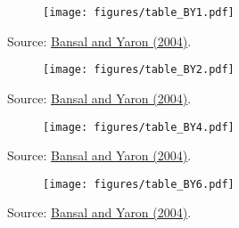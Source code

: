 \begin{frame}\label{slide:tabI}
\begin{scriptsize}
		\begin{figure}
			\texttt{[image: figures/table\_BY1.pdf]}
		\end{figure}
		\begin{tiny}
		\begin{center}
		Source: \href{http://onlinelibrary.wiley.com/doi/10.1111/j.1540-6261.2004.00670.x/abstract}{Bansal and Yaron (2004)}.
		\end{center}
		\end{tiny}
\end{scriptsize}
\end{frame}

\begin{frame}\label{slide:tabII}
\begin{scriptsize}
		\begin{figure}
			\texttt{[image: figures/table\_BY2.pdf]}
		\end{figure}
		\begin{tiny}
		\begin{center}
		Source: \href{http://onlinelibrary.wiley.com/doi/10.1111/j.1540-6261.2004.00670.x/abstract}{Bansal and Yaron (2004)}.
		\end{center}
		\end{tiny}
\end{scriptsize}
\end{frame}

\begin{frame}\label{slide:tabIV}
\begin{scriptsize}
		\begin{figure}
			\texttt{[image: figures/table\_BY4.pdf]}
		\end{figure}
		\begin{tiny}
		\begin{center}
		Source: \href{http://onlinelibrary.wiley.com/doi/10.1111/j.1540-6261.2004.00670.x/abstract}{Bansal and Yaron (2004)}.
		\end{center}
		\end{tiny}
\end{scriptsize}
\end{frame}

\begin{frame}\label{slide:tabVI}
\begin{scriptsize}
		\begin{figure}
			\texttt{[image: figures/table\_BY6.pdf]}
		\end{figure}
		\begin{tiny}
		\begin{center}
		Source: \href{http://onlinelibrary.wiley.com/doi/10.1111/j.1540-6261.2004.00670.x/abstract}{Bansal and Yaron (2004)}.
		\end{center}
		\end{tiny}
\end{scriptsize}
\end{frame}


